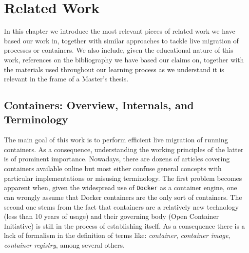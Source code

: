 \chapter{Related Work} \label{chap:related-work}

In this chapter we introduce the most relevant pieces of related work we have based our work in, together with similar approaches to tackle live migration of processes or containers.
We also include, given the educational nature of this work, references on the bibliography we have based our claims on, together with the materials used throughout our learning process as we understand it is relevant in the frame of a Master's thesis.

\section{Containers: Overview, Internals, and Terminology}

The main goal of this work is to perform efficient live migration of running containers.
As a consequence, understanding the working principles of the latter is of prominent importance.
Nowadays, there are dozens of articles covering containers available online but most either confuse general concepts with particular implementations or misusing terminology.
The first problem becomes apparent when, given the widespread use of \texttt{Docker} as a container engine, one can wrongly assume that Docker containers are the only sort of containers.
The second one stems from the fact that containers are a relatively new technology (less than 10 years of usage) and their governing body (Open Container Initiative) is still in the process of establishing itself.
As a consequence there is a lack of formalism in the definition of terms like: \textit{container}, \textit{container image}, \textit{container registry}, among several others.

